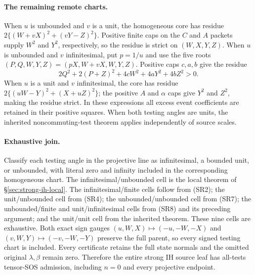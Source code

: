 \paragraph{The remaining remote charts.}
When $u$ is unbounded and $v$ is a unit, the homogeneous core has
residue $2\{(W+vX)^2+(vY-Z)^2\}$. Positive finite caps on the $C$
and $A$ packets supply $W^2$ and $Y^2$, respectively, so the residue
is strict on $(W,X,Y,Z)$. When $u$ is unbounded and $v$ infinitesimal,
put $p=1/u$ and use the five roots
$(P,Q,W,Y,Z)=(pX,W+vX,W,Y,Z)$. Positive caps $c,a,b$ give the residue
\[
 2Q^2+2(P+Z)^2+4cW^2+4aY^2+4bZ^2>0.
\tag{SR8}
\]
When $u$ is a unit and $v$ infinitesimal, the core has residue
$2\{(uW-Y)^2+(X+uZ)^2\}$; the positive $A$ and $\alpha$ caps give
$Y^2$ and $Z^2$, making the residue strict. In these expressions all
excess event coefficients are retained in their positive squares.
When both testing angles are units, the inherited noncommuting-test
theorem applies independently of source scales.

\paragraph{Exhaustive join.}
Classify each testing angle in the projective line as infinitesimal,
a bounded unit, or unbounded, with literal zero and infinity included
in the corresponding homogeneous chart. The infinitesimal/unbounded
cell is the local theorem of \S\ref{sec:strong-ih-local}.
The infinitesimal/finite cells follow from (SR2); the unit/unbounded
cell from (SR4); the unbounded/unbounded cell from (SR7); the
unbounded/finite and unit/infinitesimal cells from (SR8) and its
preceding argument; and the unit/unit cell from the inherited theorem.
These nine cells are exhaustive. Both exact sign gauges
$(u,W,X)\mapsto(-u,-W,-X)$ and
$(v,W,Y)\mapsto(-v,-W,-Y)$ preserve the full parent, so every
signed testing chart is included. Every certificate retains the full
state normals and the omitted original $\lambda,\beta$ remain zero.
Therefore the entire strong IH source leaf has all-tests tensor-SOS
admission, including $n=0$ and every projective endpoint.
